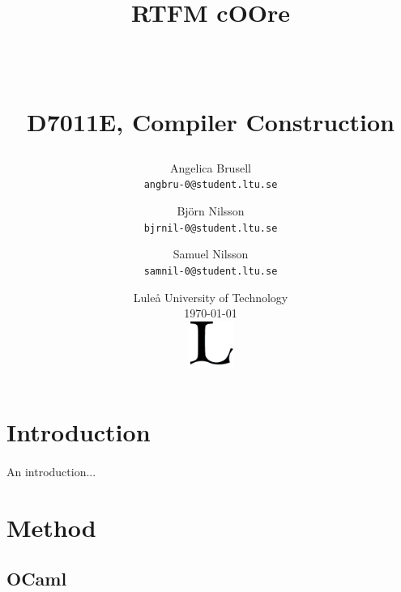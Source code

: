\documentclass[paper=a4, fontsize=11pt]{article}
\numberwithin{equation}{section}	%
\numberwithin{figure}{section}		%
\numberwithin{table}{section}		%
\begin{document}
\title{	
		\huge \strut RTFM cOOre \strut \\
		\Large \bfseries \strut D7011E, Compiler Construction \strut
}
\author{
        Angelica Brusell \\
        \texttt{angbru-0@student.ltu.se}
\and
        Bj\"orn Nilsson\\
        \texttt{bjrnil-0@student.ltu.se}
\and
        Samuel Nilsson\\
        \texttt{samnil-0@student.ltu.se}
}
\date{\vspace{2em}Lule{\aa} University of Technology \\ \today \\
\vspace{-2.7em}\hspace{-14.5em}\includegraphics[width=4em]{LTU.png}\hspace{10em}}
\maketitle

\vspace{1em}
\setcounter{tocdepth}{2}
\tableofcontents
\vspace{1em}

\section{Introduction}
    \paragraph{}
        An introduction...

\section {Method}
    \subsection {OCaml}
    
    \paragraph{}
        
\end{document}
